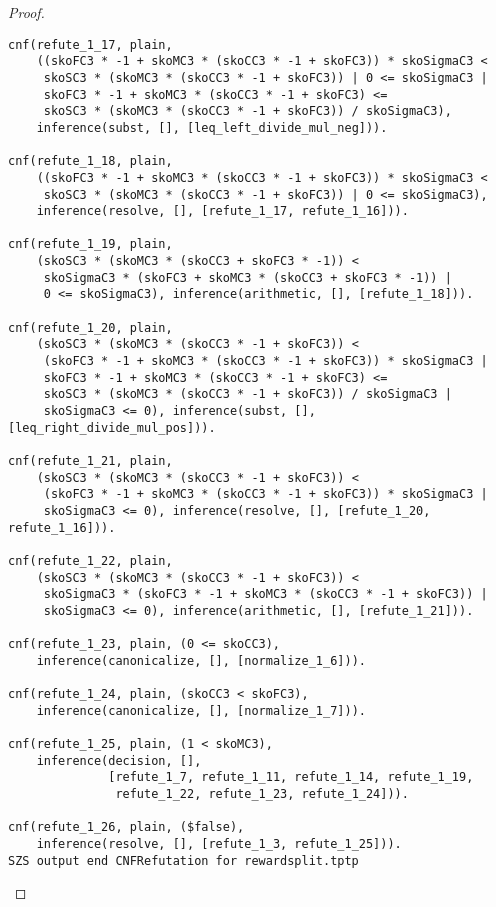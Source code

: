 \begin{proof}
\begin{verbatim}
cnf(refute_1_17, plain,
    ((skoFC3 * -1 + skoMC3 * (skoCC3 * -1 + skoFC3)) * skoSigmaC3 <
     skoSC3 * (skoMC3 * (skoCC3 * -1 + skoFC3)) | 0 <= skoSigmaC3 |
     skoFC3 * -1 + skoMC3 * (skoCC3 * -1 + skoFC3) <=
     skoSC3 * (skoMC3 * (skoCC3 * -1 + skoFC3)) / skoSigmaC3),
    inference(subst, [], [leq_left_divide_mul_neg])).

cnf(refute_1_18, plain,
    ((skoFC3 * -1 + skoMC3 * (skoCC3 * -1 + skoFC3)) * skoSigmaC3 <
     skoSC3 * (skoMC3 * (skoCC3 * -1 + skoFC3)) | 0 <= skoSigmaC3),
    inference(resolve, [], [refute_1_17, refute_1_16])).

cnf(refute_1_19, plain,
    (skoSC3 * (skoMC3 * (skoCC3 + skoFC3 * -1)) <
     skoSigmaC3 * (skoFC3 + skoMC3 * (skoCC3 + skoFC3 * -1)) |
     0 <= skoSigmaC3), inference(arithmetic, [], [refute_1_18])).

cnf(refute_1_20, plain,
    (skoSC3 * (skoMC3 * (skoCC3 * -1 + skoFC3)) <
     (skoFC3 * -1 + skoMC3 * (skoCC3 * -1 + skoFC3)) * skoSigmaC3 |
     skoFC3 * -1 + skoMC3 * (skoCC3 * -1 + skoFC3) <=
     skoSC3 * (skoMC3 * (skoCC3 * -1 + skoFC3)) / skoSigmaC3 |
     skoSigmaC3 <= 0), inference(subst, [], [leq_right_divide_mul_pos])).

cnf(refute_1_21, plain,
    (skoSC3 * (skoMC3 * (skoCC3 * -1 + skoFC3)) <
     (skoFC3 * -1 + skoMC3 * (skoCC3 * -1 + skoFC3)) * skoSigmaC3 |
     skoSigmaC3 <= 0), inference(resolve, [], [refute_1_20, refute_1_16])).

cnf(refute_1_22, plain,
    (skoSC3 * (skoMC3 * (skoCC3 * -1 + skoFC3)) <
     skoSigmaC3 * (skoFC3 * -1 + skoMC3 * (skoCC3 * -1 + skoFC3)) |
     skoSigmaC3 <= 0), inference(arithmetic, [], [refute_1_21])).

cnf(refute_1_23, plain, (0 <= skoCC3),
    inference(canonicalize, [], [normalize_1_6])).

cnf(refute_1_24, plain, (skoCC3 < skoFC3),
    inference(canonicalize, [], [normalize_1_7])).

cnf(refute_1_25, plain, (1 < skoMC3),
    inference(decision, [],
              [refute_1_7, refute_1_11, refute_1_14, refute_1_19,
               refute_1_22, refute_1_23, refute_1_24])).

cnf(refute_1_26, plain, ($false),
    inference(resolve, [], [refute_1_3, refute_1_25])).
SZS output end CNFRefutation for rewardsplit.tptp
\end{verbatim}
  \fi
\end{proof}

